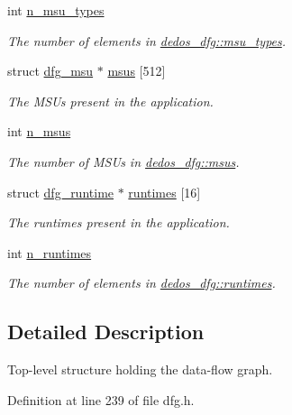 \begin{DoxyCompactItemize}
int \hyperlink{structdedos__dfg_ac78a52257324eec0ccf425530c84e91a}{n\-\_\-msu\-\_\-types}
\begin{DoxyCompactList}\small\item\em The number of elements in \hyperlink{structdedos__dfg_a6413c359339136a9acaf77df3b897305}{dedos\-\_\-dfg\-::msu\-\_\-types}. \end{DoxyCompactList}\item 
struct \hyperlink{structdfg__msu}{dfg\-\_\-msu} $\ast$ \hyperlink{structdedos__dfg_a5177dba1dea7f8f2fb383c5839c5f5f7}{msus} \mbox{[}512\mbox{]}
\begin{DoxyCompactList}\small\item\em The M\-S\-Us present in the application. \end{DoxyCompactList}\item 
int \hyperlink{structdedos__dfg_ad2f0a4385c8adcb46e74c872fdbed428}{n\-\_\-msus}
\begin{DoxyCompactList}\small\item\em The number of M\-S\-Us in \hyperlink{structdedos__dfg_a5177dba1dea7f8f2fb383c5839c5f5f7}{dedos\-\_\-dfg\-::msus}. \end{DoxyCompactList}\item 
struct \hyperlink{structdfg__runtime}{dfg\-\_\-runtime} $\ast$ \hyperlink{structdedos__dfg_a90ca69ed86b7f3d3286e4cdd4ddcae7f}{runtimes} \mbox{[}16\mbox{]}
\begin{DoxyCompactList}\small\item\em The runtimes present in the application. \end{DoxyCompactList}\item 
int \hyperlink{structdedos__dfg_ad222786891e1415cff70c46f083992df}{n\-\_\-runtimes}
\begin{DoxyCompactList}\small\item\em The number of elements in \hyperlink{structdedos__dfg_a90ca69ed86b7f3d3286e4cdd4ddcae7f}{dedos\-\_\-dfg\-::runtimes}. \end{DoxyCompactList}\end{DoxyCompactItemize}


\subsection{Detailed Description}
Top-\/level structure holding the data-\/flow graph. 

Definition at line 239 of file dfg.\-h.




